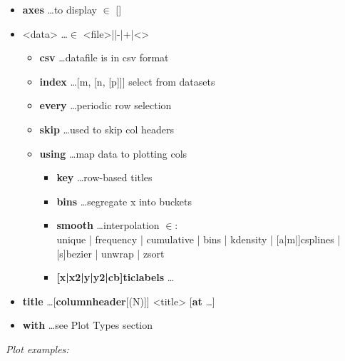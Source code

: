 {\footnotesize 
\begin{itemize}[label=|-]
\item \textbf{axes} \dots to display $\in$ []
\item <data> \dots $\in$ <file>|\textquotesingle \textquotesingle|\textquotesingle -\textquotesingle|\textquotesingle +\textquotesingle|<>
    \begin{itemize}[label=|-]
	\item \textbf{csv} \dots datafile is in csv format
	\item \textbf{index} \dots [m, [n, [p]]] select from datasets
	\item \textbf{every} \dots periodic row selection
	\item \textbf{skip} \dots used to skip col headers
	\item \textbf{using} \dots map data to plotting cols
	    \begin{itemize}[label=|-]
		\item \textbf{key} \dots row-based titles
    	\item \textbf{bins} \dots segregate x into buckets
    	\item \textbf{smooth} \dots interpolation $\in$: \\
    	   unique | frequency | cumulative | bins | kdensity | [a|m|]csplines | [s]bezier | unwrap | zsort
		\item \textbf{{[x|x2|y|y2|cb]}ticlabels} \dots 
	    \end{itemize}
    \end{itemize}
\item \textbf{title} \dots [\textbf{columnheader}[(N)]] <title> [\textbf{at} \dots]
\item \textbf{with} \dots see Plot Types section
\end{itemize}}
\vspace{2mm}

\textit{Plot examples:}\\
\\
\\
\\
\\
\\
\\
\\
\\
\\
\\
 
